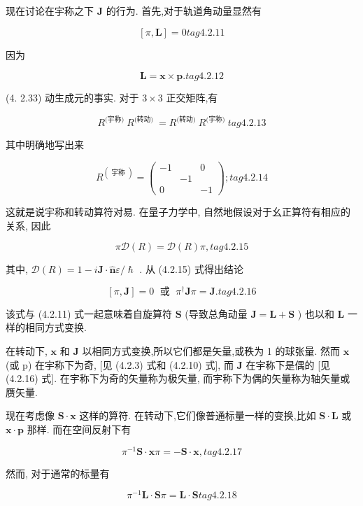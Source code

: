 现在讨论在宇称之下 $\mathbf{J}$ 的行为. 首先,对于轨道角动量显然有

$$
\left\lbrack {\pi ,\mathbf{L}}\right\rbrack = 0 tag{4.2.11}
$$

因为

$$
\mathbf{L} = \mathbf{x} \times \mathbf{p}. tag{4.2.12}
$$

(4. 2.33) 动生成元的事实. 对于 $3 \times 3$ 正交矩阵,有

$$
{R}^{\text{(宇称) }}{R}^{\text{(转动) }} = {R}^{\text{(转动) }}{R}^{\text{(宇称) }} tag{4.2.13}
$$

其中明确地写出来

$$
{R}^{\left( \text{ 宇称 }\right) } = \left( \begin{matrix} - 1 & & 0 \\ & - 1 & \\ 0 & & - 1 \end{matrix}\right) ; tag{4.2.14}
$$

这就是说宇称和转动算符对易. 在量子力学中, 自然地假设对于幺正算符有相应的关系, 因此

$$
\pi \mathcal{D}\left( R\right) = \mathcal{D}\left( R\right) \pi , tag{4.2.15}
$$

其中, $\mathcal{D}\left( R\right) = 1 - i\mathbf{J} \cdot \widehat{\mathbf{n}}\varepsilon /\hslash$ . 从 (4.2.15) 式得出结论

$$
\left\lbrack {\pi ,\mathbf{J}}\right\rbrack = 0\;\text{ 或 }\;{\pi }^{ \dagger }\mathbf{J}\pi = \mathbf{J}. tag{4.2.16}
$$

该式与 (4.2.11) 式一起意味着自旋算符 $\mathbf{S}$ (导致总角动量 $\mathbf{J} = \mathbf{L} + \mathbf{S}$ ) 也以和 $\mathbf{L}$ 一样的相同方式变换.

在转动下, $\mathbf{x}$ 和 $\mathbf{J}$ 以相同方式变换,所以它们都是矢量,或秩为 1 的球张量. 然而 $\mathbf{x}$ (或 p) 在宇称下为奇, [见 (4.2.3) 式和 (4.2.10) 式], 而 $\mathbf{J}$ 在宇称下是偶的 [见 (4.2.16) 式]. 在宇称下为奇的矢量称为极矢量, 而宇称下为偶的矢量称为轴矢量或赝矢量.

现在考虑像 $\mathbf{S} \cdot \mathbf{x}$ 这样的算符. 在转动下,它们像普通标量一样的变换,比如 $\mathbf{S} \cdot \mathbf{L}$ 或 $\mathbf{x} \cdot \mathbf{p}$ 那样. 而在空间反射下有

$$
{\pi }^{-1}\mathbf{S} \cdot \mathbf{x}\pi = - \mathbf{S} \cdot \mathbf{x}, tag{4.2.17}
$$

然而, 对于通常的标量有

$$
{\pi }^{-1}\mathbf{L} \cdot \mathbf{S}\pi = \mathbf{L} \cdot \mathbf{S} tag{4.2.18}
$$

